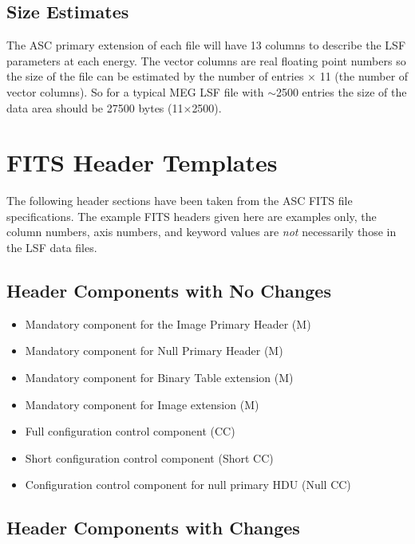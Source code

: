 \documentclass[twoside]{article}
\begin{document}
\subsection{Size Estimates}

The ASC primary extension of each file will have 13 columns 
to describe the LSF parameters at each energy. The vector columns
are real floating point numbers so the size of the file can be 
estimated by the number of entries $\times$ 11 (the number of 
vector columns). So for a typical MEG LSF file with $\sim$2500 entries
the size of the data area should be 27500 bytes (11$\times$2500). 

\section{FITS Header Templates}

The following header sections have been taken from the ASC 
FITS file specifications. The example FITS headers given 
here are examples only, the column numbers, axis numbers, and
keyword values are {\it not} necessarily those in the LSF data files. 

\subsection{Header Components with No Changes}

\begin{itemize}

\item{Mandatory component for the Image Primary Header (M)}

\item{Mandatory component for Null Primary Header (M)}

\item{Mandatory component for Binary Table extension (M)}

\item{Mandatory component for Image extension (M)}

\item{Full configuration control component (CC)}

\item{Short configuration control component (Short CC)}

\item{Configuration control component for null primary HDU (Null CC)}

\end{itemize}

\subsection{Header Components with Changes}
\end{document}
